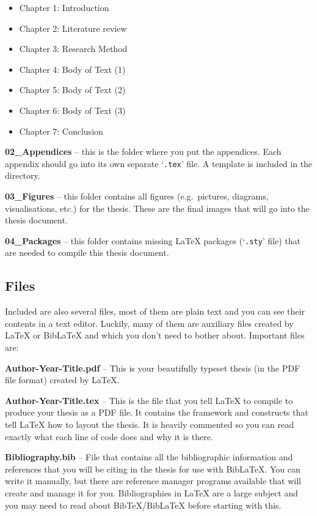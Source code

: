 \begin{itemize}
    \item Chapter 1: Introduction
    \item Chapter 2: Literature review
    \item Chapter 3: Research Method
    \item Chapter 4: Body of Text (1)
    \item Chapter 5: Body of Text (2)
    \item Chapter 6: Body of Text (3)
    \item Chapter 7: Conclusion
\end{itemize}

\textbf{02\_Appendices} -- this is the folder where you put the appendices. Each appendix should go into its own separate `\texttt{.tex}' file. A template is included in the directory.

\textbf{03\_Figures} -- this folder contains all figures (e.g.~pictures, diagrams, visualisations, etc.) for the thesis. These are the final images that will go into the thesis document.

\textbf{04\_Packages} -- this folder contains missing \LaTeX{} packages (`\texttt{.sty}' file) that are needed to compile this thesis document.

\subsection{Files}

Included are also several files, most of them are plain text and you can see their contents in a text editor. Luckily, many of them are auxiliary files created by \LaTeX{} or BibLaTeX and which you don't need to bother about. Important files are:

\textbf{Author-Year-Title.pdf} -- This is your beautifully typeset thesis (in the PDF file format) created by \LaTeX{}.

\textbf{Author-Year-Title.tex} -- This is the file that you tell \LaTeX{} to compile to produce your thesis as a PDF file. It contains the framework and constructs that tell \LaTeX{} how to layout the thesis. It is heavily commented so you can read exactly what each line of code does and why it is there.

\textbf{Bibliography.bib} -- File that contains all the bibliographic information and references that you will be citing in the thesis for use with BibLaTeX. You can write it manually, but there are reference manager programs available that will create and manage it for you. Bibliographies in \LaTeX{} are a large subject and you may need to read about BibTeX/BibLaTeX before starting with this.

